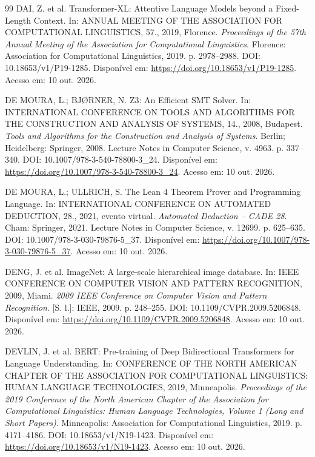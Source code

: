 \begin{thebibliography}{99}
 DAI, Z. et al. Transformer-XL: Attentive Language Models beyond a Fixed-Length Context. In: ANNUAL MEETING OF THE ASSOCIATION FOR COMPUTATIONAL LINGUISTICS, 57., 2019, Florence. \textit{Proceedings of the 57th Annual Meeting of the Association for Computational Linguistics}. Florence: Association for Computational Linguistics, 2019. p. 2978--2988. DOI: 10.18653/v1/P19-1285. Disponível em: \url{https://doi.org/10.18653/v1/P19-1285}. Acesso em: 10 out. 2026.

 DE MOURA, L.; BJØRNER, N. Z3: An Efficient SMT Solver. In: INTERNATIONAL CONFERENCE ON TOOLS AND ALGORITHMS FOR THE CONSTRUCTION AND ANALYSIS OF SYSTEMS, 14., 2008, Budapest. \textit{Tools and Algorithms for the Construction and Analysis of Systems}. Berlin; Heidelberg: Springer, 2008. Lecture Notes in Computer Science, v. 4963. p. 337--340. DOI: 10.1007/978-3-540-78800-3\_24. Disponível em: \url{https://doi.org/10.1007/978-3-540-78800-3_24}. Acesso em: 10 out. 2026.

 DE MOURA, L.; ULLRICH, S. The Lean 4 Theorem Prover and Programming Language. In: INTERNATIONAL CONFERENCE ON AUTOMATED DEDUCTION, 28., 2021, evento virtual. \textit{Automated Deduction -- CADE 28}. Cham: Springer, 2021. Lecture Notes in Computer Science, v. 12699. p. 625--635. DOI: 10.1007/978-3-030-79876-5\_37. Disponível em: \url{https://doi.org/10.1007/978-3-030-79876-5_37}. Acesso em: 10 out. 2026.

 DENG, J. et al. ImageNet: A large-scale hierarchical image database. In: IEEE CONFERENCE ON COMPUTER VISION AND PATTERN RECOGNITION, 2009, Miami. \textit{2009 IEEE Conference on Computer Vision and Pattern Recognition}. [S. l.]: IEEE, 2009. p. 248--255. DOI: 10.1109/CVPR.2009.5206848. Disponível em: \url{https://doi.org/10.1109/CVPR.2009.5206848}. Acesso em: 10 out. 2026.

 DEVLIN, J. et al. BERT: Pre-training of Deep Bidirectional Transformers for Language Understanding. In: CONFERENCE OF THE NORTH AMERICAN CHAPTER OF THE ASSOCIATION FOR COMPUTATIONAL LINGUISTICS: HUMAN LANGUAGE TECHNOLOGIES, 2019, Minneapolis. \textit{Proceedings of the 2019 Conference of the North American Chapter of the Association for Computational Linguistics: Human Language Technologies, Volume 1 (Long and Short Papers)}. Minneapolis: Association for Computational Linguistics, 2019. p. 4171--4186. DOI: 10.18653/v1/N19-1423. Disponível em: \url{https://doi.org/10.18653/v1/N19-1423}. Acesso em: 10 out. 2026.


\end{thebibliography}
